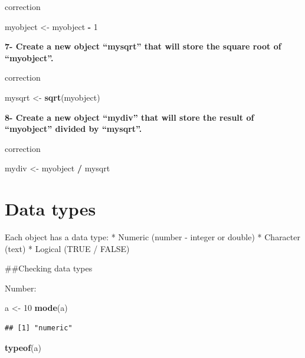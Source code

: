 \documentclass[]{book}
\newenvironment{Shaded}{\begin{snugshade}}{\end{snugshade}}
\newcommand{\DecValTok}[1]{\textcolor[rgb]{0.00,0.00,0.81}{#1}}
\newcommand{\KeywordTok}[1]{\textcolor[rgb]{0.13,0.29,0.53}{\textbf{#1}}}
\newcommand{\NormalTok}[1]{#1}
\newcommand{\OperatorTok}[1]{\textcolor[rgb]{0.81,0.36,0.00}{\textbf{#1}}}
\newcommand{\StringTok}[1]{\textcolor[rgb]{0.31,0.60,0.02}{#1}}
\begin{document}
correction

\begin{Shaded}
\begin{Highlighting}[]
\NormalTok{myobject <-}\StringTok{ }\NormalTok{myobject }\OperatorTok{-}\StringTok{ }\DecValTok{1}
\end{Highlighting}
\end{Shaded}

\textbf{7- Create a new object ``mysqrt'' that will store the square root of ``myobject''.}

correction

\begin{Shaded}
\begin{Highlighting}[]
\NormalTok{mysqrt <-}\StringTok{ }\KeywordTok{sqrt}\NormalTok{(myobject)}
\end{Highlighting}
\end{Shaded}

\textbf{8- Create a new object ``mydiv'' that will store the result of ``myobject'' divided by ``mysqrt''.}

correction

\begin{Shaded}
\begin{Highlighting}[]
\NormalTok{mydiv <-}\StringTok{ }\NormalTok{myobject }\OperatorTok{/}\StringTok{ }\NormalTok{mysqrt}
\end{Highlighting}
\end{Shaded}

\hypertarget{data-types}{%
\chapter{Data types}\label{data-types}}

Each object has a data type:
* Numeric (number - integer or double)
* Character (text)
* Logical (TRUE / FALSE)

\#\#Checking data types

Number:

\begin{Shaded}
\begin{Highlighting}[]
\NormalTok{a <-}\StringTok{ }\DecValTok{10}
\KeywordTok{mode}\NormalTok{(a)}
\end{Highlighting}
\end{Shaded}

\begin{verbatim}
## [1] "numeric"
\end{verbatim}

\begin{Shaded}
\begin{Highlighting}[]
\KeywordTok{typeof}\NormalTok{(a)}
\end{Highlighting}
\end{Shaded}
\end{document}
